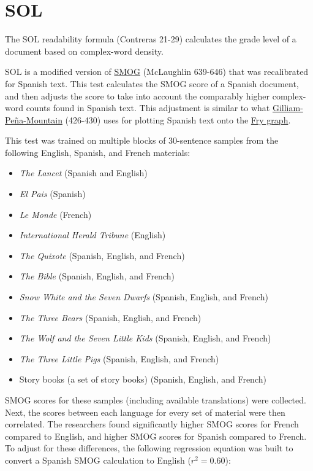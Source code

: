 \documentclass[
]{book}
\providecommand{\tightlist}{%
  \setlength{\itemsep}{0pt}\setlength{\parskip}{0pt}}
\theoremstyle{definition}
\theoremstyle{definition}
\theoremstyle{definition}
\theoremstyle{definition}
\theoremstyle{remark}
\begin{document}
\newpage

\hypertarget{sol-spanish}{%
\section{\texorpdfstring{SOL}{SOL}}\label{sol-spanish}}

The SOL readability formula (Contreras 21-29) calculates the grade level of a document based on complex-word density.

SOL is a modified version of \protect\hyperlink{smog-test}{SMOG} (McLaughlin 639-646) that was recalibrated for Spanish text. This test calculates the SMOG score of a Spanish document, and then adjusts the score to take into account the comparably higher complex-word counts found in Spanish text. This adjustment is similar to what \protect\hyperlink{gilliam-pena-mountain-fry-graph}{Gilliam-Peña-Mountain} (426-430) uses for plotting Spanish text onto the \protect\hyperlink{fry-test}{Fry graph}.

This test was trained on multiple blocks of 30-sentence samples from the following English, Spanish, and French materials:

\begin{itemize}
\tightlist
\item
  \emph{The Lancet} (Spanish and English)
\item
  \emph{El Pais} (Spanish)
\item
  \emph{Le Monde} (French)
\item
  \emph{International Herald Tribune} (English)
\item
  \emph{The Quixote} (Spanish, English, and French)
\item
  \emph{The Bible} (Spanish, English, and French)
\item
  \emph{Snow White and the Seven Dwarfs} (Spanish, English, and French)
\item
  \emph{The Three Bears} (Spanish, English, and French)
\item
  \emph{The Wolf and the Seven Little Kids} (Spanish, English, and French)
\item
  \emph{The Three Little Pigs} (Spanish, English, and French)
\item
  Story books (a set of story books) (Spanish, English, and French)
\end{itemize}

SMOG scores for these samples (including available translations) were collected. Next, the scores between each language for every set of material were then correlated. The researchers found significantly higher SMOG scores for French compared to English, and higher SMOG scores for Spanish compared to French. To adjust for these differences, the following regression equation was built to convert a Spanish SMOG calculation to English (\(r^2 = 0.60\)):
\end{document}

